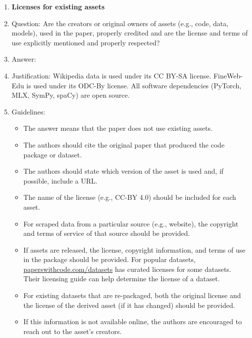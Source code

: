 \documentclass{article}
\begin{document}
\begin{enumerate}
\item {\bf Licenses for existing assets}
    \item[] Question: Are the creators or original owners of assets (e.g., code, data, models), used in the paper, properly credited and are the license and terms of use explicitly mentioned and properly respected?
    \item[] Answer: \answerYes{}
    \item[] Justification: Wikipedia data is used under its CC BY-SA license. FineWeb-Edu \citep{penedo2024fineweb} is used under its ODC-By license. All software dependencies (PyTorch, MLX, SymPy, spaCy) are open source.
    \item[] Guidelines:
    \begin{itemize}
        \item The answer \answerNA{} means that the paper does not use existing assets.
        \item The authors should cite the original paper that produced the code package or dataset.
        \item The authors should state which version of the asset is used and, if possible, include a URL.
        \item The name of the license (e.g., CC-BY 4.0) should be included for each asset.
        \item For scraped data from a particular source (e.g., website), the copyright and terms of service of that source should be provided.
        \item If assets are released, the license, copyright information, and terms of use in the package should be provided. For popular datasets, \url{paperswithcode.com/datasets} has curated licenses for some datasets. Their licensing guide can help determine the license of a dataset.
        \item For existing datasets that are re-packaged, both the original license and the license of the derived asset (if it has changed) should be provided.
        \item If this information is not available online, the authors are encouraged to reach out to the asset's creators.
    \end{itemize}


\end{enumerate}
\end{document}
